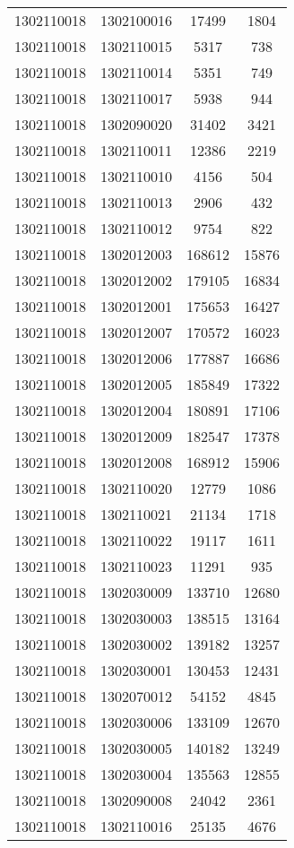 \begin{longtable}[h]{llcc}
		1302110018 & 1302100016 & 17499 & 1804\\
		1302110018 & 1302110015 & 5317 & 738\\
		1302110018 & 1302110014 & 5351 & 749\\
		1302110018 & 1302110017 & 5938 & 944\\
		1302110018 & 1302090020 & 31402 & 3421\\
		1302110018 & 1302110011 & 12386 & 2219\\
		1302110018 & 1302110010 & 4156 & 504\\
		1302110018 & 1302110013 & 2906 & 432\\
		1302110018 & 1302110012 & 9754 & 822\\
		1302110018 & 1302012003 & 168612 & 15876\\
		1302110018 & 1302012002 & 179105 & 16834\\
		1302110018 & 1302012001 & 175653 & 16427\\
		1302110018 & 1302012007 & 170572 & 16023\\
		1302110018 & 1302012006 & 177887 & 16686\\
		1302110018 & 1302012005 & 185849 & 17322\\
		1302110018 & 1302012004 & 180891 & 17106\\
		1302110018 & 1302012009 & 182547 & 17378\\
		1302110018 & 1302012008 & 168912 & 15906\\
		1302110018 & 1302110020 & 12779 & 1086\\
		1302110018 & 1302110021 & 21134 & 1718\\
		1302110018 & 1302110022 & 19117 & 1611\\
		1302110018 & 1302110023 & 11291 & 935\\
		1302110018 & 1302030009 & 133710 & 12680\\
		1302110018 & 1302030003 & 138515 & 13164\\
		1302110018 & 1302030002 & 139182 & 13257\\
		1302110018 & 1302030001 & 130453 & 12431\\
		1302110018 & 1302070012 & 54152 & 4845\\
		1302110018 & 1302030006 & 133109 & 12670\\
		1302110018 & 1302030005 & 140182 & 13249\\
		1302110018 & 1302030004 & 135563 & 12855\\
		1302110018 & 1302090008 & 24042 & 2361\\
		1302110018 & 1302110016 & 25135 & 4676\\

\end{longtable}

